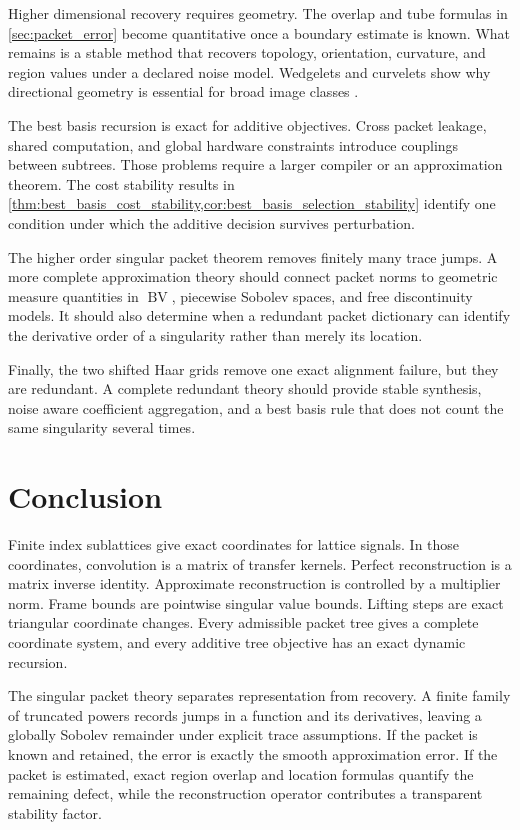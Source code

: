 \documentclass[11pt,letterpaper]{article}
\theoremstyle{plain}
\theoremstyle{plain}
\theoremstyle{plain}
\theoremstyle{definition}
\theoremstyle{definition}
\theoremstyle{definition}
\theoremstyle{definition}
\theoremstyle{remark}
\theoremstyle{remark}
\theoremstyle{remark}
\theoremstyle{remark}
\newcommand{\BV}{\operatorname{BV}}
\begin{document}
Higher dimensional recovery requires geometry. The overlap and tube formulas in \cref{sec:packet_error} become quantitative once a boundary estimate is known. What remains is a stable method that recovers topology, orientation, curvature, and region values under a declared noise model. Wedgelets and curvelets show why directional geometry is essential for broad image classes \cite{Donoho1999,CandesDonoho2004}.

The best basis recursion is exact for additive objectives. Cross packet leakage, shared computation, and global hardware constraints introduce couplings between subtrees. Those problems require a larger compiler or an approximation theorem. The cost stability results in \cref{thm:best_basis_cost_stability,cor:best_basis_selection_stability} identify one condition under which the additive decision survives perturbation.

The higher order singular packet theorem removes finitely many trace jumps. A more complete approximation theory should connect packet norms to geometric measure quantities in \(\BV\), piecewise Sobolev spaces, and free discontinuity models. It should also determine when a redundant packet dictionary can identify the derivative order of a singularity rather than merely its location.

Finally, the two shifted Haar grids remove one exact alignment failure, but they are redundant. A complete redundant theory should provide stable synthesis, noise aware coefficient aggregation, and a best basis rule that does not count the same singularity several times.

\section{Conclusion}\label{extension:section:16}\label{sec:conclusion}

Finite index sublattices give exact coordinates for lattice signals. In those coordinates, convolution is a matrix of transfer kernels. Perfect reconstruction is a matrix inverse identity. Approximate reconstruction is controlled by a multiplier norm. Frame bounds are pointwise singular value bounds. Lifting steps are exact triangular coordinate changes. Every admissible packet tree gives a complete coordinate system, and every additive tree objective has an exact dynamic recursion.

The singular packet theory separates representation from recovery. A finite family of truncated powers records jumps in a function and its derivatives, leaving a globally Sobolev remainder under explicit trace assumptions. If the packet is known and retained, the error is exactly the smooth approximation error. If the packet is estimated, exact region overlap and location formulas quantify the remaining defect, while the reconstruction operator contributes a transparent stability factor.
\end{document}
